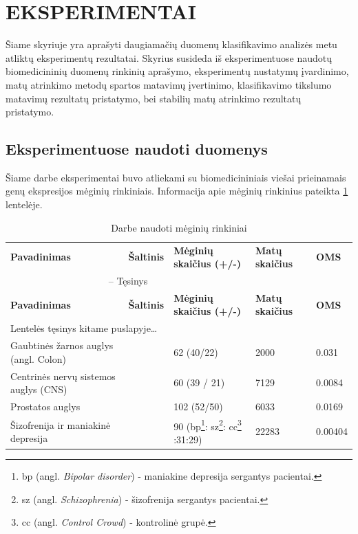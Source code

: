 \section{EKSPERIMENTAI}
\label{eksperimentai}

Šiame skyriuje yra aprašyti daugiamačių duomenų klasifikavimo analizės metu atliktų eksperimentų rezultatai. Skyrius susideda iš eksperimentuose naudotų biomedicininių duomenų rinkinių aprašymo, eksperimentų nustatymų įvardinimo, matų atrinkimo metodų spartos matavimų įvertinimo, klasifikavimo tikslumo matavimų rezultatų pristatymo, bei stabilių matų atrinkimo rezultatų pristatymo. 

\subsection{Eksperimentuose naudoti duomenys}
\label{eksperimentuose_naudoti_duomenys}

Šiame darbe eksperimentai buvo atliekami su biomedicininiais viešai prieinamais genų ekspresijos mėginių rinkiniais. Informacija apie mėginių rinkinius pateikta \ref{table:datasets} lentelėje.
\begin{longtable}{|p{4.5cm}|p{2cm}|p{3.5cm}|p{2.3cm}|p{2cm}|}
\captionsetup{labelsep=period}
\caption{Darbe naudoti mėginių rinkiniai\label{table:datasets}}\\
\hline \hline
{\textbf{Pavadinimas}} &
{\textbf{Šaltinis}} &
{\textbf{Mėginių skaičius (+/-)}} &
{\textbf{Matų \newline skaičius}} &
{\textbf{OMS}}\\
\hline
\endfirsthead
\multicolumn{3}{c}{{\tablename} \thetable{} -- Tęsinys} \\[0.5ex]
\hline \hline
{\textbf{Pavadinimas}} &
{\textbf{Šaltinis}} &
{\textbf{Mėginių skaičius (+/-)}}&
{\textbf{Matų \newline skaičius}} &
{\textbf{OMS}}\\
\hline
\endhead
\multicolumn{3}{l}{{Lentelės tęsinys kitame puslapyje\ldots}} \\
\endfoot
\hline \hline
\endlastfoot
\hline 
Gaubtinės žarnos auglys (angl. Colon) 
& 
\cite{alon1999broad} 
& 
62 (40/22) 
& 
2000 
& 
0.031 \\
\hline
Centrinės nervų sistemos auglys (CNS) 
& 
\cite{pomeroy2002prediction} 
& 
60 (39 / 21) 
& 
7129 
& 
0.0084 \\
\hline
Prostatos auglys 
& 
\cite{singh2002gene} 
& 
102 (52/50) 
& 
6033 
& 
0.0169 \\
\hline
Šizofrenija ir maniakinė depresija
&
\cite{altara}
&
90 \newline (bp\footnote{bp (angl. \textit{Bipolar disorder}) - maniakine depresija sergantys pacientai.}:
sz\footnote{sz (angl. \textit{Schizophrenia}) - šizofrenija sergantys pacientai.}:
cc\footnote{cc (angl. \textit{Control Crowd}) - kontrolinė grupė.} \newline =30:31:29)
&
22283
&
0.00404 \\
\hline
\end{longtable}

